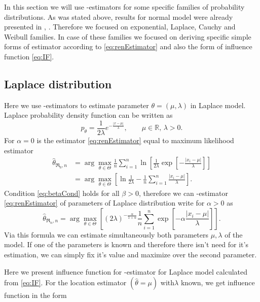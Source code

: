 
In this section we will use \mRa-estimators for some specific families of probability distributions. As was stated above, results for normal model were already presented in  \cite{Vajda2009}, \cite{Demut2010}. Therefore we focused on exponential, Laplace, Cauchy and Weibull families. In case of these families we focused on deriving specific simple forms of estimator according to \eqref{eq:renEstimator} and also the form of influence function \eqref{eq:IF}.

\subsection{Laplace distribution} 
Here we use \mRa-estimators to estimate parameter $\theta = (\mu,\lambda)$ in Laplace model. Laplace probability density function can be written as 
\begin{equation}
	p_\theta = \frac{1}{2\lambda} e^{-\frac{|x-\mu|}{\lambda}}, \qquad \mu\in \mathbb{R},\, \lambda>0.
\end{equation}
For $\alpha = 0$ is the estimator \eqref{eq:renEstimator} equal to maximum likelihood estimator
\begin{align}
	\hat{\theta}_{\mathfrak{R}_0,n} & = \arg \max_{\theta \in \Theta} \frac{1}{n} \sum^n_{i=1} \ln \left[ \frac{1}{2\lambda}\exp \left[-\frac{|x_i-\mu|}{\lambda} \right] \right] \nonumber \\
	& =  \arg \max_{\theta \in \Theta} \left[ \ln \frac{1}{2\lambda} - \frac{1}{n} \sum^n_{i=1} \frac{|x_i-\mu|}{\lambda} \right].
\end{align}
Condition \ref{eq:betaCond} holds for all $\beta>0$, therefore we can \mRa-estimator \eqref{eq:renEstimator} of parameters of Laplace distribution write for $\alpha>0$ as
\begin{equation}
	\hat{\theta}_{\mathfrak{R}_\alpha,n} = \arg \max_{\theta \in \Theta} \left[ (2\lambda)^{-\frac{\alpha}{1+\alpha}} \frac{1}{n} \sum_{i=1}^n \exp \left[-\alpha\frac{|x_i-\mu|}{\lambda} \right] \right].
	\label{renyi-formula-laplace}
\end{equation}
Via this formula we can estimate simultaneously both parameters $\mu, \lambda$ of the model. If one of the parameters is known and therefore there isn't need for it's estimation, we can simply fix it's value and maximize over the second parameter.

Here we present influence function for \mRa-estimator for Laplace model calculated from \eqref{eq:IF}. For the location estimator $(\hat{\theta} = \mu)$ with$\lambda$ known, we get influence function in the form

